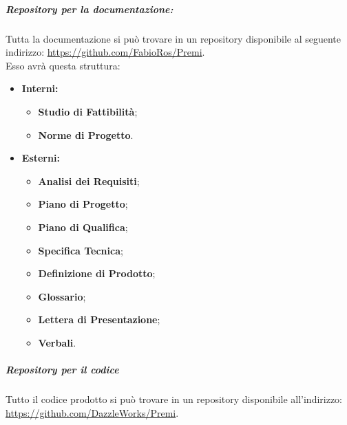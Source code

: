 	\subparagraph{Repository per la documentazione:}
	Tutta la documentazione si può trovare in un \gls{repository} disponibile al seguente indirizzo: \url{https://github.com/FabioRos/Premi}. \\
	Esso avrà questa struttura:
	\begin{itemize}
		\item \textbf{Interni:}
			\begin{itemize}
				\item \textbf{Studio di Fattibilità};
				\item \textbf{Norme di Progetto}.
			\end{itemize}
		\item \textbf{Esterni:}
			\begin{itemize}
				\item \textbf{Analisi dei Requisiti};
				\item \textbf{Piano di Progetto};
				\item \textbf{Piano di Qualifica};
				\item \textbf{Specifica Tecnica};
				\item \textbf{Definizione di Prodotto};
				\item \textbf{Glossario};
				\item \textbf{Lettera di Presentazione};
				\item \textbf{Verbali}.
			\end{itemize}
	\end{itemize}
	
	\subparagraph{Repository per il codice}
	Tutto il codice prodotto si può trovare in un \gls{repository} disponibile all'indirizzo: \url{https://github.com/DazzleWorks/Premi}.
	
